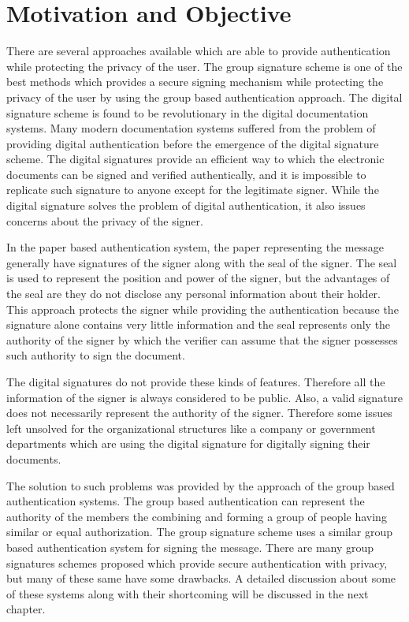 \section{Motivation and Objective}
There are several approaches available which are able to provide authentication while protecting the privacy of the user. The group signature scheme is one of the best methods which provides a secure signing mechanism while protecting the privacy of the user by using the group based authentication approach. The digital signature scheme is found to be revolutionary in the digital documentation systems. Many modern documentation systems suffered from the problem of providing digital authentication before the emergence of the digital signature scheme. The digital signatures provide an efficient way to which the electronic documents can be signed and verified authentically, and it is impossible to replicate such signature to anyone except for the legitimate signer. While the digital signature solves the problem of digital authentication, it also issues concerns about the privacy of the signer.

In the paper based authentication system, the paper representing the message generally have signatures of the signer along with the seal of the signer. The seal is used to represent the position and power of the signer, but the advantages of the seal are they do not disclose any personal information about their holder. This approach protects the signer while providing the authentication because the signature alone contains very little information and the seal represents only the authority of the signer by which the verifier can assume that the signer possesses such authority to sign the document.

The digital signatures do not provide these kinds of features. Therefore all the information of the signer is always considered to be public. Also, a valid signature does not necessarily represent the authority of the signer. Therefore some issues left unsolved for the organizational structures like a company or government departments which are using the digital signature for digitally signing their documents.

The solution to such problems was provided by the approach of the group based authentication systems. The group based authentication can represent the authority of the members the combining and forming a group of people having similar or equal authorization. The group signature scheme uses a similar group based authentication system for signing the message. There are many group signatures schemes proposed which provide secure authentication with privacy, but many of these same have some drawbacks. A detailed discussion about some of these systems along with their shortcoming will be discussed in the next chapter.

